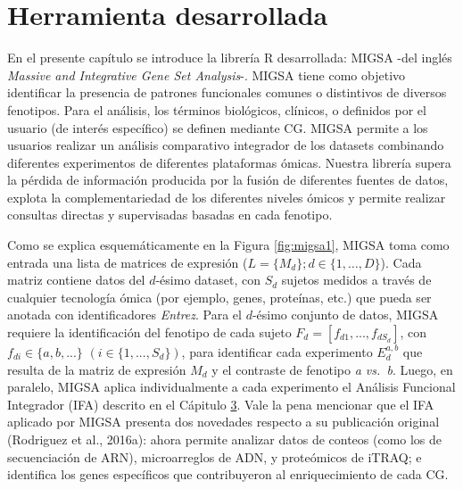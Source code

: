 \documentclass[12pt,twoside]{reedthesis}
\begin{document}
\hypertarget{herramienta-desarrollada}{%
\section{Herramienta desarrollada}\label{herramienta-desarrollada}}

\par

En el presente capítulo se introduce la librería R desarrollada: MIGSA -del inglés \emph{Massive and Integrative Gene Set Analysis}-. MIGSA tiene como objetivo identificar la presencia de patrones funcionales comunes o distintivos de diversos fenotipos. Para el análisis, los términos biológicos, clínicos, o definidos por el usuario (de interés específico) se definen mediante CG. MIGSA permite a los usuarios realizar un análisis comparativo integrador de los datasets combinando diferentes experimentos de diferentes plataformas ómicas. Nuestra librería supera la pérdida de información producida por la fusión de diferentes fuentes de datos, explota la complementariedad de los diferentes niveles ómicos y permite realizar consultas directas y supervisadas basadas en cada fenotipo.

\par

Como se explica esquemáticamente en la Figura \ref{fig:migsa1}, MIGSA toma como entrada una lista de matrices de expresión (\(L=\{M_d\}; d \in \{1,\ldots,D\}\)). Cada matriz contiene datos del \(d\)-ésimo dataset, con \(S_d\) sujetos medidos a través de cualquier tecnología ómica (por ejemplo, genes, proteínas, etc.) que pueda ser anotada con identificadores \emph{Entrez}. Para el \(d\)-ésimo conjunto de datos, MIGSA requiere la identificación del fenotipo de cada sujeto \(F_d=[f_{d1},...,f_{dS_d}]\), con \(f_{di} \in \{a,b,...\}\) \((i\in \{1,...,S_d\})\), para identificar cada experimento \(E_{d}^{a,b}\) que resulta de la matriz de expresión \(M_d\) y el contraste de fenotipo \emph{a vs.~b}. Luego, en paralelo, MIGSA aplica individualmente a cada experimento el Análisis Funcional Integrador (IFA) descrito en el Cápitulo \protect\hyperlink{cap:ifa}{3}. Vale la pena mencionar que el IFA aplicado por MIGSA presenta dos novedades respecto a su publicación original (Rodriguez et al., 2016a): ahora permite analizar datos de conteos (como los de secuenciación de ARN), microarreglos de ADN, y proteómicos de iTRAQ; e identifica los genes específicos que contribuyeron al enriquecimiento de cada CG.
\end{document}
